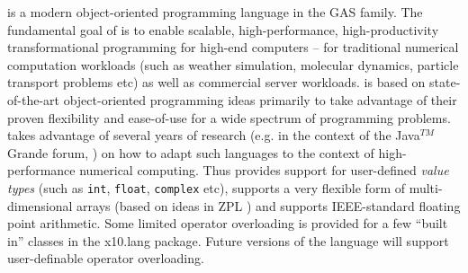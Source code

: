 \Xten{} is a modern object-oriented programming language
in the GAS family. The fundamental goal of \Xten{} is to enable
scalable, high-performance, high-productivity transformational
programming for high-end computers -- for traditional numerical
computation workloads (such as weather simulation, molecular dynamics,
particle transport problems etc) as well as commercial server
workloads.
\Xten{} is based on state-of-the-art object-oriented
programming ideas primarily to take advantage of their proven
flexibility and ease-of-use for a wide spectrum of programming
problems. \Xten{} takes advantage of several years of research (e.g.{}
in the context of the Java$^{TM}$ Grande forum,
\cite{moreira00java,kava}) on how to adapt such languages to the context of
high-performance numerical computing. Thus \Xten{} provides support
for user-defined {\em value types} (such as {\tt int}, {\tt float},
{\tt complex} etc), supports a very
flexible form of multi-dimensional arrays (based on ideas in ZPL
\cite{zpl}) and supports IEEE-standard floating point arithmetic.
Some limited operator overloading is provided for a few ``built in''
classes in the {\cf x10.lang} package.  Future versions of the
language will support user-definable operator overloading.

